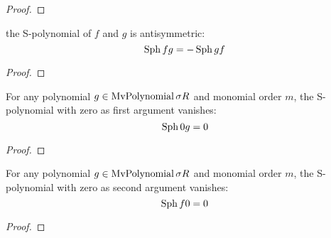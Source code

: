         \begin{proof}
          \leanok
        \end{proof}
        

        \begin{lemma}\label{sPolynomial_antisymm}
          \leanok
          the S-polynomial of $f$ and $g$ is antisymmetric:
\[
  \operatorname{Sph}{f}{g} = -\operatorname{Sph}{g}{f}
\]

        \end{lemma}
        
        \begin{proof}
          
          \leanok
        \end{proof}
        

        \begin{lemma}\label{sPolynomial_eq_zero_of_left_eq_zero}
          \leanok
          For any polynomial $g \in \operatorname{MvPolynomial}{\sigma}{R}$ and monomial order $m$,
the S-polynomial with zero as first argument vanishes:
\[
  \operatorname{Sph}{0}{g} = 0
\]

        \end{lemma}
        
        \begin{proof}
          
          \leanok
        \end{proof}
        

        \begin{lemma}\label{sPolynomial_eq_zero_of_right_eq_zero’}
          \leanok
          For any polynomial $g \in \operatorname{MvPolynomial}{\sigma}{R}$ and monomial order $m$,
the S-polynomial with zero as second argument vanishes:
\[
  \operatorname{Sph}{f}{0} = 0
\]

        \end{lemma}
        
        \begin{proof}
          \leanok
        \end{proof}
        

